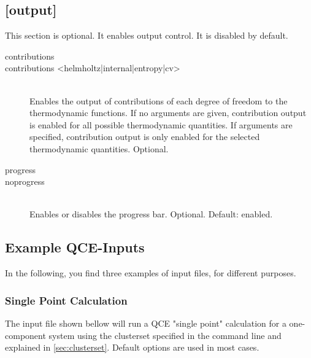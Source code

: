 \documentclass{scrartcl}
\begin{document}
\subsection*{[output]}
\vspace{-0.3cm}

This section is optional.
It enables output control.
It is disabled by default.

\begin{description}
    \item[contributions]
    \item[contributions <helmholtz|internal|entropy|cv>] \hfill \\
        Enables the output of contributions of each degree of freedom to the thermodynamic functions.
        If no arguments are given, contribution output is enabled for all possible thermodynamic quantities.
        If arguments are specified, contribution output is only enabled for the selected thermodynamic quantities.
        Optional.
    \item[progress]
    \item[noprogress] \hfill \\
        Enables or disables the progress bar.
        Optional. Default: enabled.
\end{description}

\newpage
\subsection*{Example QCE-Inputs}
\vspace{-0.3cm}
In the following, you find three examples of input files, for different purposes.

\subsubsection*{Single Point Calculation}\vspace{-0.3cm}
The input file shown bellow will run a QCE "single point" calculation for a one-component system 
using the clusterset specified in the command line and explained in \cref{sec:clusterset}.
Default options are used in most cases.
\end{document}
